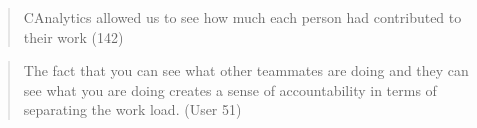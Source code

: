 \documentclass[]{article}
\begin{document}
\begin{quote}
CAnalytics allowed us to see how much each person had contributed to
their work (142)
\end{quote}

\begin{quote}
The fact that you can see what other teammates are doing and they can
see what you are doing creates a sense of accountability in terms of
separating the work load. (User 51)
\end{quote}

\printbibliography
\end{document}
